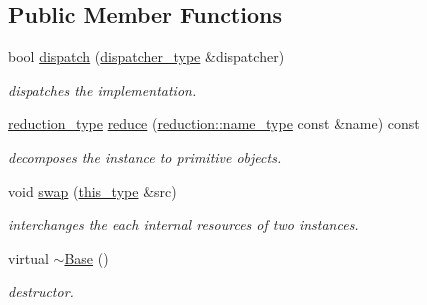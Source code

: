 \subsection*{Public Member Functions}
\begin{DoxyCompactItemize}
\item 
\hypertarget{classhryky_1_1http_1_1header_1_1field_1_1_base_aef756d94ec270c120024d1f04176851d}{bool \hyperlink{classhryky_1_1http_1_1header_1_1field_1_1_base_aef756d94ec270c120024d1f04176851d}{dispatch} (\hyperlink{classhryky_1_1http_1_1header_1_1field_1_1dispatcher_1_1_base}{dispatcher\-\_\-type} \&dispatcher)}\label{classhryky_1_1http_1_1header_1_1field_1_1_base_aef756d94ec270c120024d1f04176851d}

\begin{DoxyCompactList}\small\item\em dispatches the implementation. \end{DoxyCompactList}\item 
\hypertarget{classhryky_1_1http_1_1header_1_1field_1_1_base_a2809ad5f75abd2266e6804e90094bc05}{\hyperlink{namespacehryky_a343a9a4c36a586be5c2693156200eadc}{reduction\-\_\-type} \hyperlink{classhryky_1_1http_1_1header_1_1field_1_1_base_a2809ad5f75abd2266e6804e90094bc05}{reduce} (\hyperlink{namespacehryky_1_1reduction_ac686c30a4c8d196bbd0f05629a6b921f}{reduction\-::name\-\_\-type} const \&name) const }\label{classhryky_1_1http_1_1header_1_1field_1_1_base_a2809ad5f75abd2266e6804e90094bc05}

\begin{DoxyCompactList}\small\item\em decomposes the instance to primitive objects. \end{DoxyCompactList}\item 
\hypertarget{classhryky_1_1http_1_1header_1_1field_1_1_base_ab2b137d16fbe40d839ee136bd5304cab}{void \hyperlink{classhryky_1_1http_1_1header_1_1field_1_1_base_ab2b137d16fbe40d839ee136bd5304cab}{swap} (\hyperlink{classhryky_1_1http_1_1header_1_1field_1_1_base_ac62199121ede1697541768c2e79f5470}{this\-\_\-type} \&src)}\label{classhryky_1_1http_1_1header_1_1field_1_1_base_ab2b137d16fbe40d839ee136bd5304cab}

\begin{DoxyCompactList}\small\item\em interchanges the each internal resources of two instances. \end{DoxyCompactList}\item 
\hypertarget{classhryky_1_1http_1_1header_1_1field_1_1_base_a722da881b6c70cfcbde9243abcfbf334}{virtual \hyperlink{classhryky_1_1http_1_1header_1_1field_1_1_base_a722da881b6c70cfcbde9243abcfbf334}{$\sim$\-Base} ()}\label{classhryky_1_1http_1_1header_1_1field_1_1_base_a722da881b6c70cfcbde9243abcfbf334}

\begin{DoxyCompactList}\small\item\em destructor. \end{DoxyCompactList}\end{DoxyCompactItemize}
